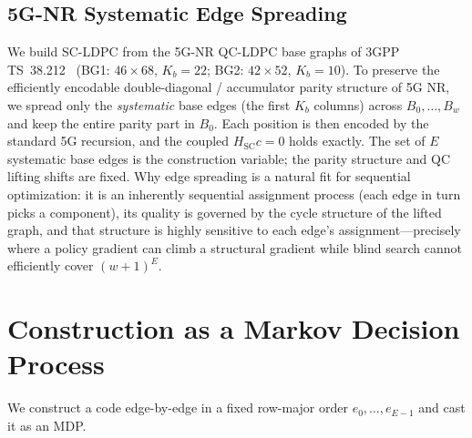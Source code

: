 \documentclass[journal]{IEEEtran}
\begin{document}
\subsection{5G-NR Systematic Edge Spreading}\label{sec:sysedge}
We build SC-LDPC from the 5G-NR QC-LDPC base graphs of 3GPP
TS~38.212~\cite{3gpp38212} (BG1: $46\times68$, $K_b{=}22$; BG2: $42\times52$,
$K_b{=}10$). To preserve the efficiently encodable double-diagonal /
accumulator parity structure of 5G NR, we spread only the \emph{systematic}
base edges (the first $K_b$ columns) across $B_0,\dots,B_w$ and keep the entire
parity part in $B_0$. Each position is then encoded by the standard 5G recursion,
and the coupled $H_{\mathrm{SC}}c=0$ holds exactly. The set of $E$ systematic
base edges is the construction variable; the parity structure and QC lifting
shifts are fixed. Why edge spreading is a natural fit for sequential
optimization: it is an inherently sequential assignment process (each edge in
turn picks a component), its quality is governed by the cycle structure of the
lifted graph, and that structure is highly sensitive to each edge's
assignment---precisely where a policy gradient can climb a structural gradient
while blind search cannot efficiently cover $(w{+}1)^E$.

\section{Construction as a Markov Decision Process}\label{sec:mdp}
We construct a code edge-by-edge in a fixed row-major order
$e_0,\dots,e_{E-1}$ and cast it as an MDP.
\end{document}
